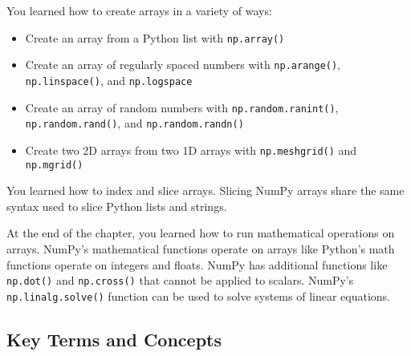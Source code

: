 \documentclass{book}
\providecommand{\tightlist}{%
      \setlength{\itemsep}{0pt}\setlength{\parskip}{0pt}}
\newcommand{\passthrough}[1]{#1}
\begin{document}
You learned how to create arrays in a variety of ways:

\begin{itemize}
\tightlist
\item
  Create an array from a Python list with
  \passthrough{\lstinline!np.array()!}
\item
  Create an array of regularly spaced numbers with
  \passthrough{\lstinline!np.arange()!},
  \passthrough{\lstinline!np.linspace()!}, and
  \passthrough{\lstinline!np.logspace!}
\item
  Create an array of random numbers with
  \passthrough{\lstinline!np.random.ranint()!},
  \passthrough{\lstinline!np.random.rand()!}, and
  \passthrough{\lstinline!np.random.randn()!}
\item
  Create two 2D arrays from two 1D arrays with
  \passthrough{\lstinline!np.meshgrid()!} and
  \passthrough{\lstinline!np.mgrid()!}
\end{itemize}

You learned how to index and slice arrays. Slicing NumPy arrays share
the same syntax used to slice Python lists and strings.

At the end of the chapter, you learned how to run mathematical
operations on arrays. NumPy's mathematical functions operate on arrays
like Python's math functions operate on integers and floats. NumPy has
additional functions like \passthrough{\lstinline!np.dot()!} and
\passthrough{\lstinline!np.cross()!} that cannot be applied to scalars.
NumPy's \passthrough{\lstinline!np.linalg.solve()!} function can be used
to solve systems of linear equations.
    




    
        \hypertarget{key-terms-and-concepts}{%
\subsection{Key Terms and Concepts}\label{key-terms-and-concepts}}
    
\end{document}
